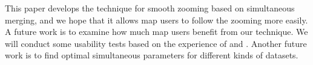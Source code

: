 \documentclass[twocolumn]{svjour3}          %
\begin{document}
This paper develops the technique for 
smooth zooming based on simultaneous merging,
and we hope that it allows map users to follow the zooming more easily.
A future work is to examine 
how much map users benefit from our technique.
We will conduct some usability tests based on the experience of
\citet[]{Suba2017Thesis} and \citet{Midtbo2007}.
Another future work is to find optimal simultaneous parameters for 
different kinds of datasets.






%




%
%


\end{document}
